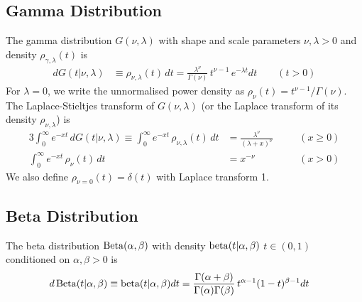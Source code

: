 \documentclass[a4paper,12pt]{article}
\begin{document}
{\subsection{Gamma Distribution}
\label{sec:gamma}

 The gamma distribution $G(\nu,\lambda)$  with shape   and scale parameters $\nu, \lambda>0$ and density  $\rho_{\gamma,\lambda}(t)$  is
\begin{align}
dG(t \vert \nu,\lambda) 
&\equiv  \rho_{\nu,\lambda}(t)  \, dt  
= \frac{\lambda^\nu}{\Gamma(\nu)}\,t^{\nu-1} \,e^{-\lambda t} dt  \qquad (t>0)
\label{eq:gamma} 
\end{align}
For $\lambda=0$, we  write   the unnormalised power density as $\rho_\nu(t) =  t^{\nu-1}/\Gamma(\nu)$.
The   Laplace-Stieltjes  transform of $G(\nu,\lambda)$ (or the  Laplace transform of its density $\rho_{\nu,\lambda}$) is
\begin{alignat}{3}
\int_0^\infty e^{-xt}\, dG(t \vert \nu,\lambda) 
\equiv \int_0^\infty e^{-xt}\,\rho_{\nu,\lambda}(t) \, dt &= \frac{\lambda^\nu}{(\lambda+x)^\nu} &&\quad (x\ge0)
\label{eq:gammaLT}  \\
\int_0^\infty e^{-xt}\, \rho_\nu(t)\, dt &=  x^{-\nu} &&\quad (x>0)
\label{eq:powerLT}
\end{alignat}  
We also define $\rho_{\nu=0}(t)=\delta(t)$ with Laplace transform 1.

\subsection{Beta Distribution}
\label{sec:beta}

The beta distribution ${\rm Beta}(\alpha,\beta)$  with density ${\rm beta}(t \vert \alpha,\beta)$ $t\in(0,1)$ conditioned on  $\alpha,\beta>0$  is
 \begin{align}
d\,{\rm Beta}(t \vert \alpha,\beta) \equiv  {\rm beta}(t\vert \alpha,\beta) dt 
&= \frac{\Gamma(\alpha+\beta)}{\Gamma(\alpha)\Gamma(\beta)} \, t^{\alpha-1}(1-t)^{\beta-1} dt %
\label{eq:beta} 
\end{align} 

}
\end{document}
